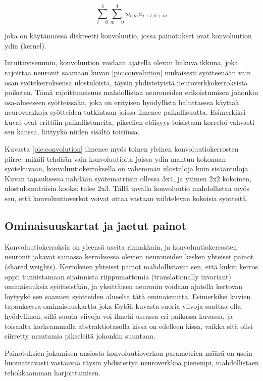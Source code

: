 \documentclass[finnish]{tktltiki2}
\theoremstyle{definition}
\theoremstyle{remark}
\begin{document}
    $$ \sum_{l=0}^{4}\sum_{m=0}^{4} w_{l,m}a_{j+l,k+m}$$
    
    joka on käytännössä diskreetti konvoluutio, jossa painotukset ovat konvoluution ydin (kernel).

    Intuitiivisemmin, konvoluution voidaan ajatella olevan liukuva ikkuna, joka rajoittaa neuronit saamaan kuvan \ref{pic:convolution} mukaisesti syötteenään vain osan syötekerroksensa ulostuloista, täysin yhdistetyistä neuroverkkokerroksista poiketen. Tämä rajoittuneisuus mahdollistaa neuroneiden erikoistumisen johonkin osa-alueeseen syötteissään, joka on erityisen hyödyllistä haluttaessa käyttää neuroverkkoja syötteiden tutkintaan joissa ilmenee paikallisuutta. Esimerkiksi kuvat ovat erittäin paikallistuneita, pikselien etäisyys toisistaan korreloi vahvasti sen kanssa, liittyykö niiden sisältö toisiinsa.

    Kuvasta \ref{pic:convolution} ilmenee myös toinen yleinen konvoluutiokerrosten piirre: mikäli tehdään vain konvoluutioita joissa ydin mahtuu kokonaan syötekuvaan, konvoluutiokerroksella on vähemmän ulostuloja kuin sisääntuloja. Kuvan tapauksessa nähdään syötematriisin ollessa 3x4, ja ytimen 2x2 kokoinen, ulostulomatriisin kooksi tulee 2x3. Tällä tavalla konvoluutio mahdollistaa myös sen, että konvoluutioverkot voivat ottaa vastaan vaihtelevan kokoisia syötteitä.

    \subsection{Ominaisuuskartat ja jaetut painot}

    Konvoluutiokerroksia on yleensä useita rinnakkain, ja konvoluutiokerrosten neuronit jakavat samassa kerroksessa olevien neuroneiden kesken yhteiset painot (shared weights). Kerroksien yhteiset painot mahdollistavat sen, että kukin kerros oppii tunnistamaan sijainnista riippumattomia (translationally invariant) ominaisuuksia syötteistään, ja yksittäisen neuronin voidaan ajatella kertovan löytyykö sen saamien syötteiden alueelta tätä ominaisuutta. Esimerkiksi kuvien tapauksessa ominaisuuskartta joka löytää kuvasta suoria viivoja saattaa olla hyödyllinen, sillä suoria viivoja voi ilmetä useassa eri paikassa kuvassa, ja toisaalta korkeammalla abstraktiotasolla kissa on edelleen kissa, vaikka sitä olisi siirretty muutamia pikseleitä johonkin suuntaan.

    Painotuksien jakamisen ansiosta konvoluutioverkon parametrien määrä on usein huomattavasti vastaavaa täysin yhdistettyä neuroverkkoa pienempi, mahdollistaen tehokkaamman harjoittamisen.
\end{document}
